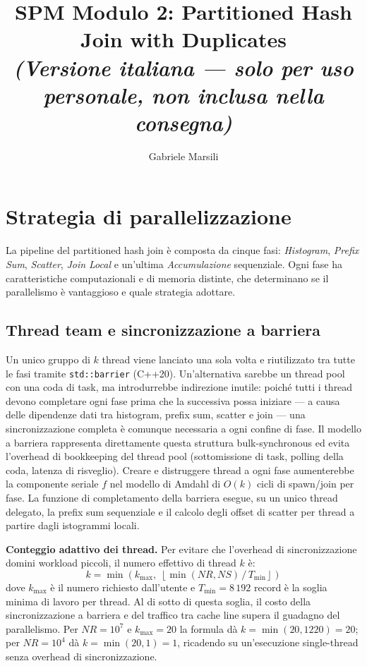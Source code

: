 \documentclass[10pt,a4paper,twocolumn]{article}
\title{\vspace{-1.5em}\textbf{SPM Modulo 2: Partitioned Hash Join with Duplicates}\\
\small\textit{(Versione italiana --- solo per uso personale, non inclusa nella consegna)}\vspace{-0.5em}}
\author{Gabriele Marsili}
\date{}
\begin{document}
\maketitle
\vspace{-1.5em}

\section{Strategia di parallelizzazione}

La pipeline del partitioned hash join è composta da cinque fasi: \textit{Histogram}, \textit{Prefix Sum}, \textit{Scatter}, \textit{Join Local} e un'ultima \textit{Accumulazione} sequenziale. Ogni fase ha caratteristiche computazionali e di memoria distinte, che determinano se il parallelismo è vantaggioso e quale strategia adottare.

\subsection*{Thread team e sincronizzazione a barriera}

Un unico gruppo di $k$ thread viene lanciato una sola volta e riutilizzato tra tutte le fasi tramite \texttt{std::barrier} (C++20). Un'alternativa sarebbe un thread pool con una coda di task, ma introdurrebbe indirezione inutile: poiché tutti i thread devono completare ogni fase prima che la successiva possa iniziare --- a causa delle dipendenze dati tra histogram, prefix sum, scatter e join --- una sincronizzazione completa è comunque necessaria a ogni confine di fase. Il modello a barriera rappresenta direttamente questa struttura bulk-synchronous ed evita l'overhead di bookkeeping del thread pool (sottomissione di task, polling della coda, latenza di risveglio). Creare e distruggere thread a ogni fase aumenterebbe la componente seriale $f$ nel modello di Amdahl di $O(k)$ cicli di spawn/join per fase. La funzione di completamento della barriera esegue, su un unico thread delegato, la prefix sum sequenziale e il calcolo degli offset di scatter per thread a partire dagli istogrammi locali.

\textbf{Conteggio adattivo dei thread.} Per evitare che l'overhead di sincronizzazione domini workload piccoli, il numero effettivo di thread $k$ è:
\[
  k = \min\!\left(k_{\max},\;\left\lfloor \min(NR, NS) \,/\, T_{\min} \right\rfloor\right)
\]
dove $k_{\max}$ è il numero richiesto dall'utente e $T_{\min} = 8\,192$ record è la soglia minima di lavoro per thread. Al di sotto di questa soglia, il costo della sincronizzazione a barriera e del traffico tra cache line supera il guadagno del parallelismo. Per $NR = 10^7$ e $k_{\max} = 20$ la formula dà $k = \min(20, 1220) = 20$; per $NR = 10^4$ dà $k = \min(20, 1) = 1$, ricadendo su un'esecuzione single-thread senza overhead di sincronizzazione.
\end{document}

